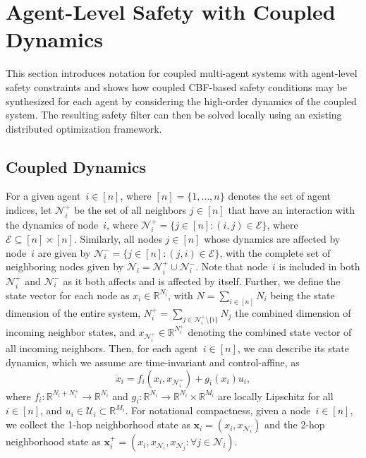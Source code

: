 \documentclass[letterpaper, 10 pt, conference]{ieeeconf}  %
\theoremstyle{plain}
\begin{document}
\section{Agent-Level Safety with Coupled Dynamics} \label{sec:coupled_safety_cond}
This section introduces notation for coupled multi-agent systems with agent-level safety constraints and shows how coupled CBF-based safety conditions may be synthesized for each agent by considering the high-order dynamics of the coupled system. The resulting safety filter can then be solved locally using an existing distributed optimization framework.   
\subsection{Coupled Dynamics} \label{sec:coupled_dyn}
For a given agent~$i \in [n]$, where $[n] = \{1, \dots, n\}$ denotes the set of agent indices, let $\mathcal{N}_i^+$ be the set of all neighbors $j \in [n]$ that have an interaction with the dynamics of node~$i$, where $\mathcal{N}_i^+ = \{j \in [n]: (i,j) \in \mathcal{E} \}$, where $\mathcal{E} \subseteq [n] \times [n]$.
Similarly, all nodes $j \in [n] $ whose dynamics are affected by node~$i$ are given by $\mathcal{N}_i^- = \{j \in [n]: (j,i) \in \mathcal{E} \}$,
with the complete set of neighboring nodes given by $\mathcal{N}_i = \mathcal{N}_i^+ \cup \mathcal{N}_i^-$.
Note that node~$i$ is included in both $\mathcal{N}_i^+$ and $\mathcal{N}_i^-$ as it both affects and is affected by itself. 
Further, we define the state vector for each node as $x_i \in \mathbb{R}^{N_i}$, with $N = \sum_{i \in [n]} N_i$ being the state dimension of the entire system, $N_i^+ = \sum_{j \in \mathcal{N}_i^+ \setminus \{ i\}} N_j$ the combined dimension of incoming neighbor states, and $x_{\mathcal{N}_i^+} \in \mathbb{R}^{N_i^+}$ denoting the combined state vector of all incoming neighbors.  Then, for each agent~$i \in [n]$, we can describe its state dynamics, which we assume are time-invariant and control-affine, as
\begin{equation} \label{eq:net_dyn_sys}
    \dot{x}_i = f_i(x_i, x_{\mathcal{N}_i^+}) + g_i(x_i) u_i,
\end{equation}
where $f_i:\mathbb{R}^{N_i + N_i^+} \rightarrow \mathbb{R}^{N_i}$ and $g_i:  \mathbb{R}^{N_i} \rightarrow \mathbb{R}^{N_i} \times \mathbb{R}^{M_i}$ are locally Lipschitz for all $i \in [n]$, and $u_i \in \mathcal{U}_i \subset \mathbb{R}^{M_i}$. 
For notational compactness, given a node~$i \in [n]$, we collect the 1-hop neighborhood state as $\mathbf{x}_i = (x_i, x_{\mathcal{N}_i})$ and the 2-hop neighborhood state as $\mathbf{x}_i^+ = (x_i, x_{\mathcal{N}_i}, x_{\mathcal{N}_j}:\forall j \in \mathcal{N}_i)$.
\end{document}

